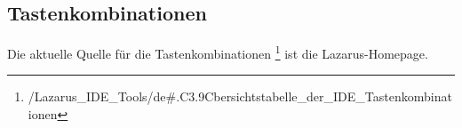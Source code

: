 \subsection[Tastenkombinationen]{Tastenkombinationen}
Die aktuelle Quelle für die Tastenkombinationen \footnote{/Lazarus\_\-IDE\_Tools/\-de\#.C3.9Cbersichts\-tabelle\_der\_IDE\_Tasten\-kombinationen} ist die Lazarus-Homepage\cite{wi.Tast}.

